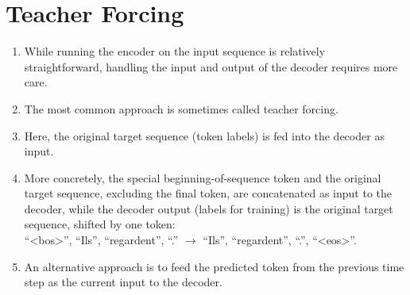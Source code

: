 \section{Teacher Forcing \cite{dnn-1}} \label{Teacher Forcing}

\begin{enumerate}
    \item While running the encoder on the input sequence is relatively straightforward, handling the input and output of the decoder requires more care. 
    
    \item The most common approach is sometimes called teacher forcing. 
    
    \item Here, the original target sequence (token labels) is fed into the decoder as input. 
    
    \item More concretely, the special beginning-of-sequence token and the original target sequence, excluding the final token, are concatenated as input to the decoder, while the decoder output (labels for training) is the original target sequence, shifted by one token:\\
    “<bos>”, “Ils”, “regardent”, “.” $\rightarrow$ “Ils”, “regardent”, “.”, “<eos>”.

    \item An alternative approach is to feed the predicted token from the previous time step as the current input to the decoder.

\end{enumerate}































